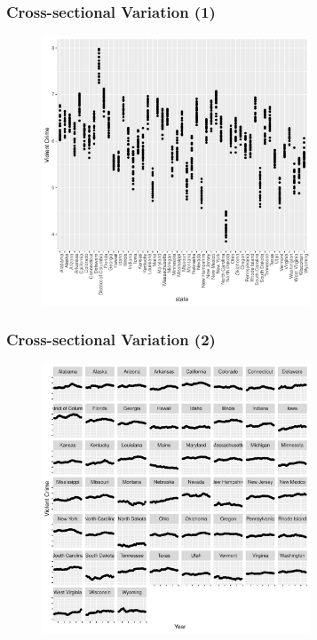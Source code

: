 \documentclass{beamer}
\newcommand{\1}{\mathbb{1}}
\begin{document}
\begin{frame}\frametitle{Cross-sectional Variation (1)}
\begin{figure}
\includegraphics[width = 8cm]{plot/State}
\end{figure}
\end{frame}

\begin{frame}\frametitle{Cross-sectional Variation (2)}
\begin{figure}
\includegraphics[width = 8cm]{plot/State_wrap}
\end{figure}
\end{frame}
\end{document}
